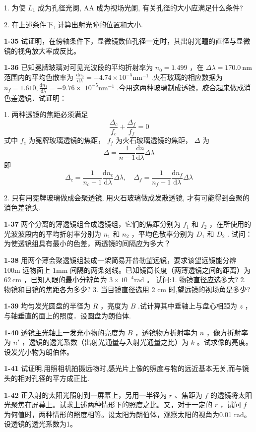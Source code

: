 1. 为使 $L_{1}$ 成为孔径光阑, AA 成为视场光阑, 有关孔径的大小应满足什么条件? 

2. 在上述条件下, 计算出射光瞳的位置和大小.
\vfill
\newpage

\textbf{1-35} 试证明，在傍轴条件下，显微镜数值孔径一定时，其出射光瞳的直径与显微镜的视角放大率成反比。
\vfill
\newpage

\textbf{1-36} 已知冕牌玻璃对可见光波段的平均折射率为 $n_0 = 1.499$ ，在 $\Delta \lambda = 170.0 \mathrm{~nm}$ 范围内的平均色散率为 $\frac{\mathrm{d}n_0}{\mathrm{d}\lambda} = -4.74\times 10^{-5}\mathrm{nm}^{-1}$ .火石玻璃的相应数据为 $n_f = 1.610,\frac{\mathrm{d}n_f}{\mathrm{d}\lambda} = -9.76\times$ $10^{-5}\mathrm{nm}^{-1}$ .今用这两种玻璃制成透镜，胶合起来做成消色差透镜．试证明：

1. 两种透镜的焦距必须满足
$$
\frac {\Delta_ {c}}{f _ {c}} + \frac {\Delta_ {f}}{f _ {f}} = 0
$$
式中 $f_{c}$ 为冕牌玻璃透镜的焦距， $f_{f}$ 为火石玻璃透镜的焦距， $\Delta$ 为
$$
\Delta = \frac {1}{n - 1} \frac {\mathrm{d} n}{\mathrm{d} \lambda} \Delta \lambda
$$
即
$$
\Delta_ {c} = \frac {1}{n _ {c} - 1} \frac {\mathrm{d} n _ {c}}{\mathrm{d} \lambda} \Delta \lambda , \quad \Delta_ {f} = \frac {1}{n _ {f} - 1} \frac {\mathrm{d} n _ {f}}{\mathrm{d} \lambda} \Delta \lambda
$$

2. 只有用冕牌玻璃做成会聚透镜, 用火石玻璃做成发散透镜, 才有可能得到会聚的消色差镜头.
\vfill
\newpage

\textbf{1-37} 两个分离的薄透镜组合成透镜组，它们的焦距分别为 $f_{1}$ 和 $f_{2}$ ，在所使用的光波波段内的平均折射率分别为 $n_{1}$ 和 $n_{2}$ ，平均色散率分别为 $D_{1}$ 和 $D_{2}$ . 试问：为使透镜组具有最小的色差，两透镜的间隔应为多大？
\vfill
\newpage

\textbf{1-38} 用两个薄会聚透镜组装成一架简易开普勒望远镜，要求该望远镜能分辨 $100\mathrm{m}$ 远物面上 $1\mathrm{mm}$ 间隔的两条刻线。已知镜筒长度（两薄透镜之间的距离）为 $62~\mathrm{cm}$ ，已知人眼的最小分辨角为 $3\times 10^{-4}\mathrm{rad}$ 。  试问:1. 物镜直径应选多大? 2. 物镜和目镜的焦距各为多少? 3. 当目镜直径选用 2 cm 时,望远镜的视场角是多少?
\vfill
\newpage

\textbf{1-39} 均匀发光圆盘的半径为 $R$ ，亮度为 $B$ .试计算其中垂轴上与盘心相距为 $z$ ，与轴垂直的面上的照度．设圆盘为朗伯体.
\vfill
\newpage

\textbf{1-40} 透镜主光轴上一发光小物的亮度为 $B$ ，透镜物方折射率为 $n$ ，像方折射率为 $n'$ ，透镜的透光系数（出射光通量与入射光通量之比）为 $k$ 。试求像的亮度。设发光小物为朗伯体。
\vfill
\newpage

\textbf{1-41} 试证明,用照相机拍摄远物时,感光片上像的照度与物的远近基本无关,而与镜头的相对孔径的平方成正比.
\vfill
\newpage

\textbf{1-42} 正入射的太阳光照射到一屏幕上，另用一半径为 $r$ 、焦距为 $f$ 的透镜将太阳光聚焦在屏幕上。试求上述两种情形下的照度之比。又，对于一定的 $r$ ，试问 $f$ 为何值时，两种情形的照度相等。设太阳为朗伯体，观察太阳的视角为0.01 rad。设透镜的透光系数为1。
\vfill
